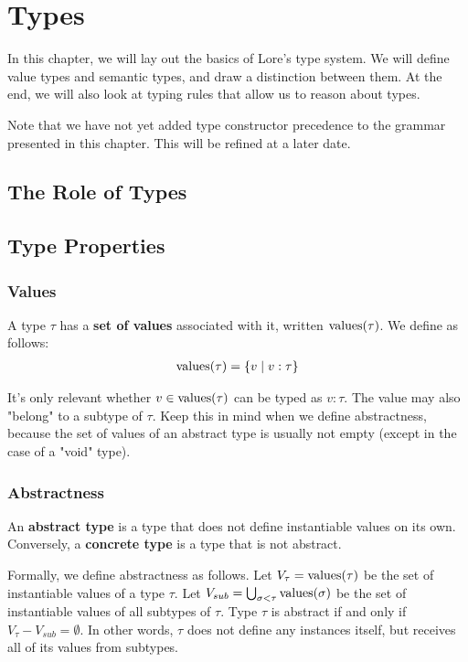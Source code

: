 \chapter{Types}

In this chapter, we will lay out the basics of Lore's type system. We will define value types and semantic types, and draw a distinction between them. At the end, we will also look at typing rules that allow us to reason about types.

Note that we have not yet added type constructor precedence to the grammar presented in this chapter. This will be refined at a later date. 



\section{The Role of Types}



\section{Type Properties}

\subsection{Values}
A type $\tau$ has a \textbf{set of values} associated with it, written $\operatorname{values}(\tau)$. We define as follows:
\begin{align*}
	\operatorname{values}(\tau) = \{ v \mid v : \tau \}
\end{align*}

\noindent It's only relevant whether $v \in \operatorname{values}(\tau)$ can be typed as $v : \tau$. The value may also "belong" to a subtype of $\tau$. Keep this in mind when we define abstractness, because the set of values of an abstract type is usually not empty (except in the case of a "void" type).


\subsection{Abstractness}
An \textbf{abstract type} is a type that does not define instantiable values on its own. Conversely, a \textbf{concrete type} is a type that is not abstract.

Formally, we define abstractness as follows. Let $V_\tau = \operatorname{values}(\tau)$ be the set of instantiable values of a type $\tau$. Let $V_{sub} = \bigcup_{\sigma < \tau} \operatorname{values}(\sigma)$ be the set of instantiable values of all subtypes of $\tau$. Type $\tau$ is abstract if and only if $V_\tau - V_{sub} = \emptyset$. In other words, $\tau$ does not define any instances itself, but receives all of its values from subtypes.

